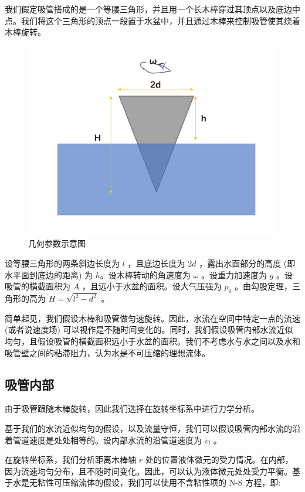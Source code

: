 \documentclass[fontset=windows]{article}
\begin{document}
我们假定吸管搭成的是一个等腰三角形，并且用一个长木棒穿过其顶点以及底边中点。我们将这个三角形的顶点一段置于水盆中，并且通过木棒来控制吸管使其绕着木棒旋转。

\begin{figure}[htbp]
    \centering
    \includegraphics[scale=0.5]{8.png}
    \caption{几何参数示意图}
    \label{2}
\end{figure}

设等腰三角形的两条斜边长度为 $l$ ，且底边长度为 $2d$ ，露出水面部分的高度 (即水平面到底边的距离) 为 $h$。设木棒转动的角速度为 $\omega$ 。设重力加速度为 $g$ 。设吸管的横截面积为 $A$ ，且远小于水盆的面积。设大气压强为 $p_0$ 。由勾股定理，三角形的高为 $H = \sqrt{l ^ 2 - d ^ 2}$ 。

简单起见，我们假设木棒和吸管做匀速旋转。因此，水流在空间中特定一点的流速 (或者说速度场) 可以视作是不随时间变化的。同时，我们假设吸管内部水流近似均匀，且假设吸管的横截面积远小于水盆的面积。我们不考虑水与水之间以及水和吸管壁之间的粘滞阻力，认为水是不可压缩的理想流体。

\subsection{吸管内部}

由于吸管跟随木棒旋转，因此我们选择在旋转坐标系中进行力学分析。

基于我们的水流近似均匀的假设，以及流量守恒，我们可以假设吸管内部水流的沿着管道速度是处处相等的。设内部水流的沿管道速度为 $v_l$ 。

在旋转坐标系，我们分析距离木棒轴 $r$ 处的位置液体微元的受力情况。在内部，因为流速均匀分布，且不随时间变化。因此，可以认为液体微元处处受力平衡。基于水是无粘性可压缩流体的假设，我们可以使用不含粘性项的 $\text{N-S}$ 方程，即:
\end{document}
